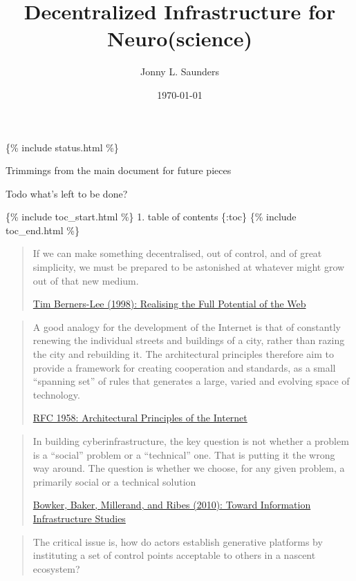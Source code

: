 \documentclass[10pt]{article}
\title{Decentralized Infrastructure for Neuro(science)}
\author{Jonny L. Saunders}
\date{\today}
\begin{document}
\maketitle
\tableofcontents
\pagebreak

\{\% include status.html \%\}

Trimmings {from the main document for future pieces}

Todo {what's left to be done?}

\{\% include toc\_start.html \%\} 1. table of contents \{:toc\} \{\%
include toc\_end.html \%\}

\begin{quote}
If we can make something decentralised, out of control, and of great
simplicity, we must be prepared to be astonished at whatever might grow
out of that new medium.

\href{https://www.w3.org/1998/02/Potential.html}{Tim Berners-Lee (1998):
Realising the Full Potential of the Web}
\end{quote}

\begin{quote}
A good analogy for the development of the Internet is that of constantly
renewing the individual streets and buildings of a city, rather than
razing the city and rebuilding it. The architectural principles
therefore aim to provide a framework for creating cooperation and
standards, as a small ``spanning set'' of rules that generates a large,
varied and evolving space of technology.

\href{https://datatracker.ietf.org/doc/html/rfc1958}{RFC 1958:
Architectural Principles of the Internet}
\end{quote}

\begin{quote}
In building cyberinfrastructure, the key question is not whether a
problem is a ``social'' problem or a ``technical'' one. That is putting
it the wrong way around. The question is whether we choose, for any
given problem, a primarily social or a technical solution

\href{https://doi.org/10.1007/978-1-4020-9789-8_5}{Bowker, Baker,
Millerand, and Ribes (2010): Toward Information Infrastructure Studies}
\cite{bowkerInformationInfrastructureStudies2010} 
\end{quote}

\begin{quote}
The critical issue is, how do actors establish generative platforms by
instituting a set of control points acceptable to others in a nascent
ecosystem? \cite{tilsonDigitalInfrastructuresMissing2010} 
\end{quote}
\end{document}

